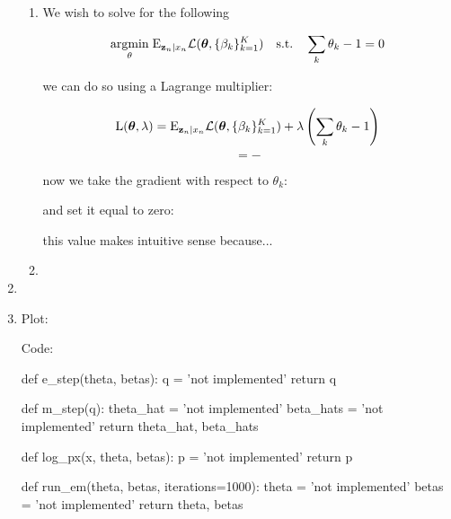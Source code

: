 \documentclass[submit]{harvardml}
\begin{document}
\begin{enumerate}
\begin{enumerate}
      
      \item 
      We wish to solve for the following
      
      $$\underset{\theta}{\mathrm{argmin}}\;\mathrm{E}_{\mathbf{z}_n|x_n}\mathcal{L}(\boldsymbol{\theta},\{\beta_k\}^K_{k=1})\quad\text{s.t.}\quad\sum_k\theta_k -1 = 0$$
      
      we can do so using a Lagrange multiplier:
      
      $$\text{L}(\boldsymbol{\theta}, \lambda) = \mathrm{E}_{\mathbf{z}_n|x_n}\mathcal{L}(\boldsymbol{\theta},\{\beta_k\}^K_{k=1}) + \lambda\left(\sum_k\theta_k-1\right)$$
      $$= - $$
      
      now we take the gradient with respect to $\theta_k$:
      
      and set it equal to zero:
      
      this value makes intuitive sense because...
      \item
    \end{enumerate}
  \item 
  \item 
    Plot:


    Code:

    \begin{python}
def e_step(theta, betas):
    q = 'not implemented'
    return q


def m_step(q):
    theta_hat = 'not implemented'
    beta_hats = 'not implemented'
    return theta_hat, beta_hats


def log_px(x, theta, betas):
    p = 'not implemented'
    return p


def run_em(theta, betas, iterations=1000):
    theta = 'not implemented'
    betas = 'not implemented'
    return theta, betas
    \end{python}
\end{enumerate}


\newpage
\end{document}
